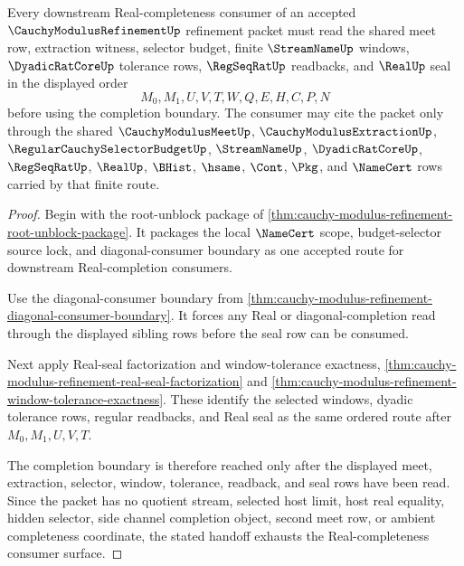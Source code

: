 \begin{theorem}
\label{thm:cauchy-modulus-refinement-real-completeness-handoff}
Every downstream Real-completeness consumer of an accepted $\CauchyModulusRefinementUp$ refinement packet must read the shared meet row, extraction witness, selector budget, finite $\StreamNameUp$ windows, $\DyadicRatCoreUp$ tolerance rows, $\RegSeqRatUp$ readbacks, and $\RealUp$ seal in the displayed order
$$
M_0,M_1,U,V,T,W,Q,E,H,C,P,N
$$
before using the completion boundary. The consumer may cite the packet only through the shared $\CauchyModulusMeetUp$, $\CauchyModulusExtractionUp$, $\RegularCauchySelectorBudgetUp$, $\StreamNameUp$, $\DyadicRatCoreUp$, $\RegSeqRatUp$, $\RealUp$, $\BHist$, $\hsame$, $\Cont$, $\Pkg$, and $\NameCert$ rows carried by that finite route.
\end{theorem}
\begin{proof}
Begin with the root-unblock package of \autoref{thm:cauchy-modulus-refinement-root-unblock-package}. It packages the local $\NameCert$ scope, budget-selector source lock, and diagonal-consumer boundary as one accepted route for downstream Real-completion consumers.

Use the diagonal-consumer boundary from \autoref{thm:cauchy-modulus-refinement-diagonal-consumer-boundary}. It forces any Real or diagonal-completion read through the displayed sibling rows before the seal row can be consumed.

Next apply Real-seal factorization and window-tolerance exactness, \autoref{thm:cauchy-modulus-refinement-real-seal-factorization} and \autoref{thm:cauchy-modulus-refinement-window-tolerance-exactness}. These identify the selected windows, dyadic tolerance rows, regular readbacks, and Real seal as the same ordered route after $M_0,M_1,U,V,T$.

The completion boundary is therefore reached only after the displayed meet, extraction, selector, window, tolerance, readback, and seal rows have been read. Since the packet has no quotient stream, selected host limit, host real equality, hidden selector, side channel completion object, second meet row, or ambient completeness coordinate, the stated handoff exhausts the Real-completeness consumer surface.
\end{proof}

